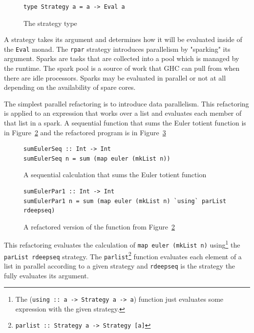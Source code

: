 \begin{figure}[t]
\begin{lstlisting}
type Strategy a = a -> Eval a
\end{lstlisting}
\caption{The strategy type}
\label{strategy}
\end{figure}   

A strategy takes its argument and determines how it will be evaluated inside of the \texttt{Eval} monad. The \texttt{rpar} strategy introduces parallelism by "sparking" its argument. Sparks are tasks that are collected into a pool which is managed by the runtime. The spark pool is a source of work that GHC can pull from when there are idle processors. Sparks may be evaluated in parallel or not at all depending on the availability of spare cores.

The simplest parallel refactoring is to introduce data parallelism. This refactoring is applied to an expression that works over a list and evaluates each member of that list in a spark. A sequential function that sums the Euler totient function is in Figure~\ref{eulerSeq} and the refactored program is in Figure~\ref{eulerPar1}

\begin{figure}[t]
\begin{lstlisting}
sumEulerSeq :: Int -> Int
sumEulerSeq n = sum (map euler (mkList n))
\end{lstlisting}
\caption{A sequential calculation that sums the Euler totient function}
\label{eulerSeq}
\end{figure} 


\begin{figure}[t]
\begin{lstlisting}
sumEulerPar1 :: Int -> Int
sumEulerPar1 n = sum (map euler (mkList n) `using` parList rdeepseq)
\end{lstlisting}
\caption{A refactored version of the function from Figure~\ref{eulerSeq}}
\label{eulerPar1}
\end{figure} 
  
This refactoring evaluates the calculation of \texttt{map euler (mkList n)} using\footnote{The (\texttt{using :: a -> Strategy a -> a}) function just evaluates some expression with the given strategy.} the \texttt{parList rdeepseq} strategy. The \texttt{parlist}\footnote{\texttt{parlist :: Strategy a -> Strategy [a]}} function evaluates each element of a list in parallel according to a given strategy and \texttt{rdeepseq} is the strategy the fully evaluates its argument. 
  
